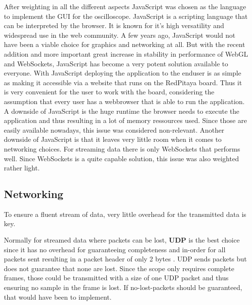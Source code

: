 After weighting in all the different aspects JavaScript was chosen as the language to implement the GUI for the oscilloscope. JavaScript is a scripting language that can be interpreted by the browser.
It is known for it's high versatility and widespread use in the web community.
A few years ago, JavaScript would not have been a viable choice for graphics and networking at all. But with the recent addition and more important great increase in stability in performance of WebGL and WebSockets, JavaScript has become a very potent solution available to everyone.
With JavaScript deploying the application to the enduser is as simple as making it accessible via a website that runs on the RedPitaya board. Thus it is very convenient for the user to work with the board, considering the assumption that every user has a webbrowser that is able to run the application.
A downside of JavaScript is the huge runtime the browser needs to execute the application and thus resulting in a lot of memory ressources used. Since those are easily available nowadays, this issue was considered non-relevant.
Another downside of JavaScript is that it leaves very little room when it comes to networking choices. For streaming data there is only WebSockets that performs well. Since WebSockets is a quite capable solution, this issue was also weighted rather light.

\subsection{Networking}

To ensure a fluent stream of data, very little overhead for the transmitted data is key.

Normally for streamed data where packets can be lost, \textbf{UDP} is the best choice since it has no overhead for guaranteeing completeness and in-order for all packets sent resulting in a packet header of only 2 bytes \cite{TODO: refrence}.
UDP sends packets but does not guarantee that none are lost. Since the scope only requires complete frames, those could be transmitted with a size of one UDP packet and thus ensuring no sample in the frame is lost. If no-lost-packets should be guaranteed, that would have been to implement.

